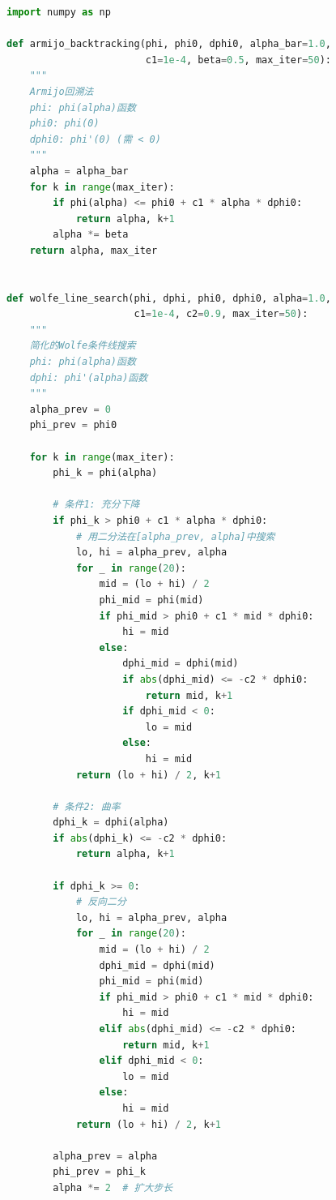 \begin{lstlisting}[language=Python, caption=不精确搜索条件实现]
import numpy as np

def armijo_backtracking(phi, phi0, dphi0, alpha_bar=1.0, 
                        c1=1e-4, beta=0.5, max_iter=50):
    """
    Armijo回溯法
    phi: phi(alpha)函数
    phi0: phi(0)
    dphi0: phi'(0) (需 < 0)
    """
    alpha = alpha_bar
    for k in range(max_iter):
        if phi(alpha) <= phi0 + c1 * alpha * dphi0:
            return alpha, k+1
        alpha *= beta
    return alpha, max_iter


def wolfe_line_search(phi, dphi, phi0, dphi0, alpha=1.0,
                      c1=1e-4, c2=0.9, max_iter=50):
    """
    简化的Wolfe条件线搜索
    phi: phi(alpha)函数
    dphi: phi'(alpha)函数
    """
    alpha_prev = 0
    phi_prev = phi0
    
    for k in range(max_iter):
        phi_k = phi(alpha)
        
        # 条件1: 充分下降
        if phi_k > phi0 + c1 * alpha * dphi0:
            # 用二分法在[alpha_prev, alpha]中搜索
            lo, hi = alpha_prev, alpha
            for _ in range(20):
                mid = (lo + hi) / 2
                phi_mid = phi(mid)
                if phi_mid > phi0 + c1 * mid * dphi0:
                    hi = mid
                else:
                    dphi_mid = dphi(mid)
                    if abs(dphi_mid) <= -c2 * dphi0:
                        return mid, k+1
                    if dphi_mid < 0:
                        lo = mid
                    else:
                        hi = mid
            return (lo + hi) / 2, k+1
        
        # 条件2: 曲率
        dphi_k = dphi(alpha)
        if abs(dphi_k) <= -c2 * dphi0:
            return alpha, k+1
        
        if dphi_k >= 0:
            # 反向二分
            lo, hi = alpha_prev, alpha
            for _ in range(20):
                mid = (lo + hi) / 2
                dphi_mid = dphi(mid)
                phi_mid = phi(mid)
                if phi_mid > phi0 + c1 * mid * dphi0:
                    hi = mid
                elif abs(dphi_mid) <= -c2 * dphi0:
                    return mid, k+1
                elif dphi_mid < 0:
                    lo = mid
                else:
                    hi = mid
            return (lo + hi) / 2, k+1
        
        alpha_prev = alpha
        phi_prev = phi_k
        alpha *= 2  # 扩大步长
    

\end{lstlisting}
